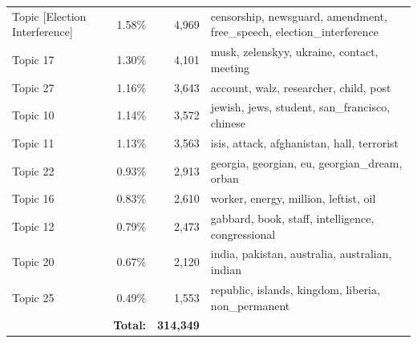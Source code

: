 \begin{table}
\begin{tabular}{lrrp{7cm}}
Topic [Election Interference] & 1.58\% & 4,969 & censorship, newsguard, amendment, free\_speech, election\_interference \\
Topic 17 & 1.30\% & 4,101 & musk, zelenskyy, ukraine, contact, meeting \\
Topic 27 & 1.16\% & 3,643 & account, walz, researcher, child, post \\
Topic 10 & 1.14\% & 3,572 & jewish, jews, student, san\_francisco, chinese \\
Topic 11 & 1.13\% & 3,563 & isis, attack, afghanistan, hall, terrorist \\
Topic 22 & 0.93\% & 2,913 & georgia, georgian, eu, georgian\_dream, orban \\
Topic 16 & 0.83\% & 2,610 & worker, energy, million, leftist, oil \\
Topic 12 & 0.79\% & 2,473 & gabbard, book, staff, intelligence, congressional \\
Topic 20 & 0.67\% & 2,120 & india, pakistan, australia, australian, indian \\
Topic 25 & 0.49\% & 1,553 & republic, islands, kingdom, liberia, non\_permanent \\
 & \textbf{Total:} & \textbf{314,349} &  \\
\bottomrule
\end{tabular}
\end{table}
